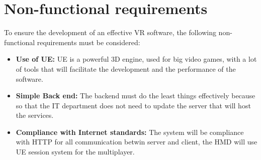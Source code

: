 \section{Non-functional requirements}
\noindent
To ensure the development of an effective \ac{VR} software, the following non-functional requirements must be considered:

\begin{itemize}
  \item \textbf{Use of \ac{UE}:} \ac{UE} is a powerful 3D engine, used for big video games, with a lot of tools that will facilitate the development and the performance of the software.
  \item \textbf{Simple Back end:} The backend must do the least things effectively because so that the IT department does not need to update the server that will host the services.
  \item \textbf{Compliance with Internet standards:} The system will be compliance with \ac{HTTP} for all communication betwin server and client, the \ac{HMD} will use \ac{UE} session system for the multiplayer.
\end{itemize}

